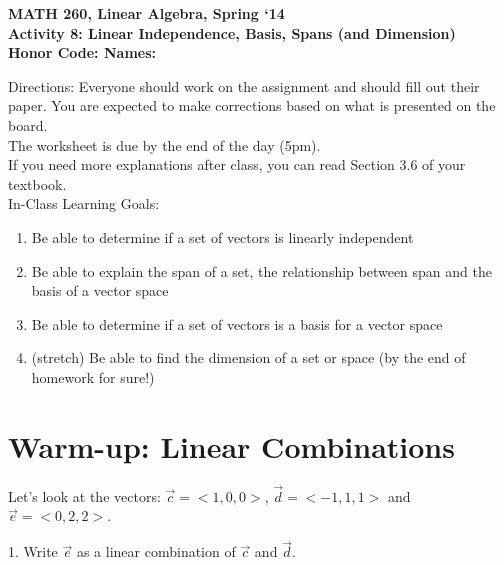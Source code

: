 \documentclass{article}
\begin{document}
\begin{flushleft}
	\bfseries{MATH 260, Linear Algebra, Spring `14}\\
	\bfseries{Activity 8:  Linear Independence, Basis, Spans (and Dimension)}\\
	\bfseries{Honor Code:} \hspace{3.5in}\bfseries{Names:}\\
\end{flushleft}
\begin{flushleft}
\vspace{.75in}
Directions:  Everyone should work on the assignment and should fill out their paper.  You are expected to make corrections based on what is presented on the board.  \\
\large The worksheet is due by the end of the day (5pm). \normalsize \\ 
If you need more explanations after class, you can read Section 3.6 of your textbook.\\
\vspace{0.1in}
\Large
In-Class Learning Goals:\\
\normalsize
\begin{enumerate}
\item Be able to determine if a set of vectors is linearly independent
\item Be able to explain the span of a set, the relationship between span and the basis of a vector space
\item Be able to determine if a set of vectors is a basis for a vector space
\item (stretch) Be able to find the dimension of a set or space (by the end of homework for sure!)

\end{enumerate}

\vspace{0.1in}

\section*{Warm-up:  Linear Combinations}

Let's look at the vectors: $\vec{c}=<1,0,0>$, $\vec{d}=<-1,1,1>$ and $\vec{e}=<0,2,2>$. 

\vspace{0.1in}

1. Write $\vec{e}$ as a linear combination of $\vec{c}$ and $\vec{d}$.

\vspace{1.5in}


\end{flushleft}
\end{document}
